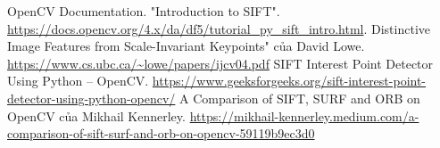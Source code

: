 \newpage
{}
\begin{thebibliography}{80}
     OpenCV Documentation. "Introduction to SIFT".
	\url{https://docs.opencv.org/4.x/da/df5/tutorial_py_sift_intro.html}.
	 Distinctive Image Features from Scale-Invariant Keypoints" của David Lowe. \url{https://www.cs.ubc.ca/~lowe/papers/ijcv04.pdf}
	 SIFT Interest Point Detector Using Python – OpenCV. \url{https://www.geeksforgeeks.org/sift-interest-point-detector-using-python-opencv/}
	 A Comparison of SIFT, SURF and ORB on OpenCV của Mikhail Kennerley.
	\url{https://mikhail-kennerley.medium.com/a-comparison-of-sift-surf-and-orb-on-opencv-59119b9ec3d0}
	
\end{thebibliography}